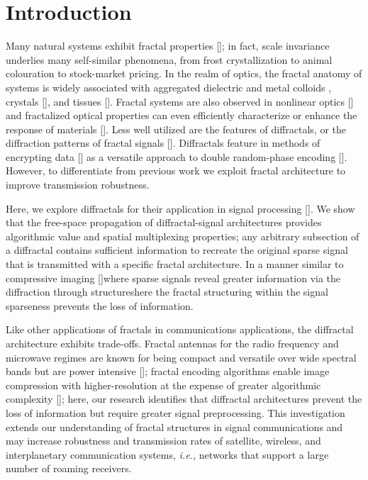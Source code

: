 \section{Introduction}
Many natural systems exhibit fractal properties [\cite{Mandlebrot}]; in fact, scale invariance underlies many self-similar phenomena, from frost crystallization to animal colouration to stock-market pricing. In the realm of optics, the fractal anatomy of systems is widely associated with aggregated dielectric and metal colloids \cite{Sorensen}, crystals [\cite{Macke}], and tissues [\cite{Schmitt}]. Fractal systems are also observed in nonlinear optics [\cite{Soljacic, Segev}] and fractalized optical properties can even efficiently characterize or enhance the response of materials [\cite{Stockman, Tsai}]. Less well utilized are the features of diffractals, or the diffraction patterns of fractal signals  [\cite{Berry,Horvath,Hou}]. Diffractals feature in methods of encrypting data [\cite{Barrera}] as a versatile approach to double random-phase encoding [\cite{Unnikrishnan}]. However, to differentiate from previous work we exploit fractal architecture to improve transmission robustness.

Here, we explore diffractals for their application in signal processing [\cite{Verma,Verma2}].  We show that the free-space propagation of diffractal-signal architectures provides algorithmic value and spatial multiplexing properties; any arbitrary subsection of a diffractal contains sufficient information to recreate the original sparse signal that is transmitted with a specific fractal architecture. In a manner similar to compressive imaging [\cite{Kelly07, Howland}]\textemdash where sparse signals reveal greater information via the diffraction through structures\textemdash here the fractal structuring within the signal sparseness prevents the loss of information.

Like other applications of fractals in communications applications, the diffractal architecture exhibits trade-offs. Fractal antennas for the radio frequency and microwave regimes are known for being compact and versatile over wide spectral bands but are power intensive [\cite{Radonic,Puente-Baliarda}]; fractal encoding algorithms enable image compression with higher-resolution at the expense of greater algorithmic complexity [\cite{Jacquin}]; here, our research identifies that diffractal architectures prevent the loss of information but require greater signal preprocessing.  This investigation extends our understanding of fractal structures in signal communications and may increase robustness and transmission rates of satellite, wireless, and interplanetary communication systems, {\it i.e.,} networks that support a large number of roaming receivers.

